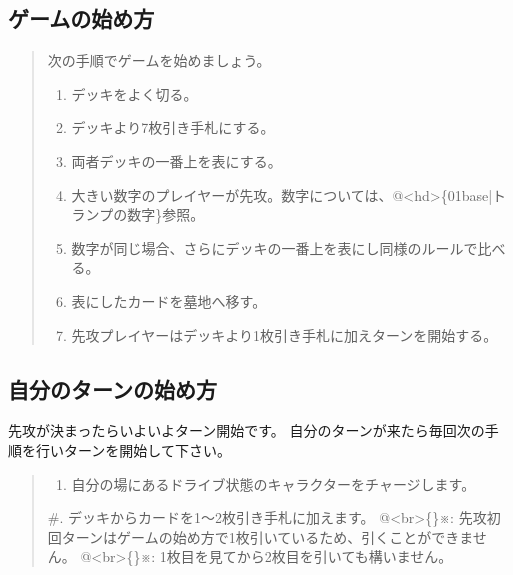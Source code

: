 \documentclass[letterpaper,10pt,dvipdfmx]{sphinxmanual}
\begin{document}
\subsection{ゲームの始め方}
\label{\detokenize{common/02-turn:id2}}\begin{quote}

次の手順でゲームを始めましょう。
\begin{enumerate}
%
\item {} 
デッキをよく切る。

\item {} 
デッキより7枚引き手札にする。

\item {} 
両者デッキの一番上を表にする。

\item {} 
大きい数字のプレイヤーが先攻。数字については、@\textless{}hd\textgreater{}\{01\sphinxhyphen{}base|トランプの数字\}参照。

\item {} 
数字が同じ場合、さらにデッキの一番上を表にし同様のルールで比べる。

\item {} 
表にしたカードを墓地へ移す。

\item {} 
先攻プレイヤーはデッキより1枚引き手札に加えターンを開始する。

\end{enumerate}
\end{quote}


\subsection{自分のターンの始め方}
\label{\detokenize{common/02-turn:id3}}
先攻が決まったらいよいよターン開始です。
自分のターンが来たら毎回次の手順を行いターンを開始して下さい。
\begin{quote}
\begin{enumerate}
%
\item {} 
自分の場にあるドライブ状態のキャラクターをチャージします。

\end{enumerate}

\#. デッキからカードを1〜2枚引き手札に加えます。
@\textless{}br\textgreater{}\{\}※: 先攻初回ターンはゲームの始め方で1枚引いているため、引くことができません。
@\textless{}br\textgreater{}\{\}※: 1枚目を見てから2枚目を引いても構いません。
\end{quote}
\end{document}
